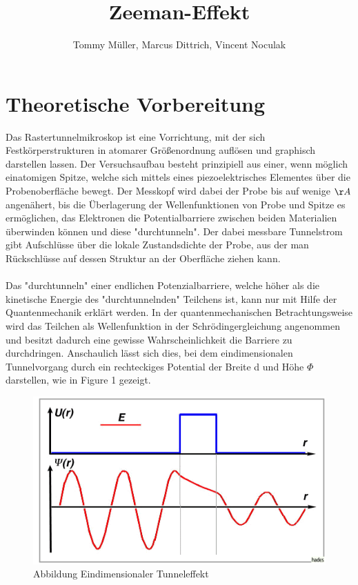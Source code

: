 \documentclass[10pt,a4paper]{article}
\author{Tommy Müller, Marcus Dittrich, Vincent Noculak}
\title{Zeeman-Effekt}
\begin{document}
\maketitle
\newpage
\tableofcontents
\newpage

\section{ Theoretische Vorbereitung}

Das Rastertunnelmikroskop ist eine Vorrichtung, mit der sich Festkörperstrukturen in atomarer Größenordnung auflösen und graphisch darstellen lassen. Der Versuchsaufbau besteht prinzipiell aus einer, wenn möglich einatomigen Spitze, welche sich mittels eines piezoelektrisches Elementes über die Probenoberfläche bewegt. Der Messkopf wird dabei der Probe bis auf wenige $\AA$ angenähert, bis die Überlagerung der Wellenfunktionen von Probe und Spitze es ermöglichen, das Elektronen die Potentialbarriere zwischen beiden Materialien überwinden können und diese "durchtunneln". Der dabei messbare Tunnelstrom gibt Aufschlüsse über die lokale Zustandsdichte der Probe, aus der man Rückschlüsse auf dessen Struktur an der Oberfläche ziehen kann. \\ \\Das "durchtunneln" einer endlichen Potenzialbarriere, welche höher als die kinetische Energie des "durchtunnelnden" Teilchens ist, kann nur mit Hilfe der Quantenmechanik erklärt werden. In der quantenmechanischen Betrachtungsweise wird das Teilchen als Wellenfunktion in der Schrödingergleichung angenommen und besitzt dadurch eine gewisse Wahrscheinlichkeit die Barriere zu durchdringen. Anschaulich lässt sich dies, bei dem eindimensionalen Tunnelvorgang durch ein rechteckiges Potential der Breite d und Höhe $\Phi$ darstellen, wie in Figure 1 gezeigt.
\begin{figure}[h]
	\includegraphics[scale = 0.8]{tunnel.png}
	\centering
	\caption{Abbildung Eindimensionaler Tunneleffekt}
	\label{diagramm_aufspaltung}
\end{figure}
\end{document}

